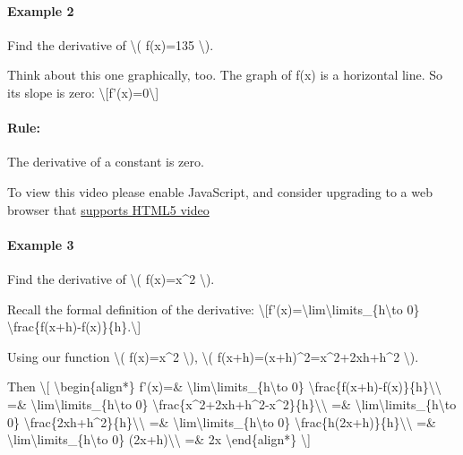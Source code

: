 \hypertarget{example-2}{%
\paragraph{Example 2}\label{example-2}}

Find the derivative of \textbackslash{}( f(x)=135 \textbackslash{}).

Think about this one graphically, too. The graph of f(x) is a horizontal
line. So its slope is zero:
\textbackslash{}{[}f'(x)=0\textbackslash{}{]}

\hypertarget{rule-1}{%
\paragraph{Rule:}\label{rule-1}}

The derivative of a constant is zero.

To view this video please enable JavaScript, and consider upgrading to a
web browser that \href{http://videojs.com/html5-video-support/}{supports
HTML5 video}

\hypertarget{example-3}{%
\paragraph{Example 3}\label{example-3}}

Find the derivative of \textbackslash{}( f(x)=x\^{}2 \textbackslash{}).

Recall the formal definition of the derivative:
\textbackslash{}{[}f'(x)=\textbackslash{}lim\textbackslash{}limits\_\{h\textbackslash{}to
0\} \textbackslash{}frac\{f(x+h)-f(x)\}\{h\}.\textbackslash{}{]}

Using our function \textbackslash{}( f(x)=x\^{}2 \textbackslash{}),
\textbackslash{}( f(x+h)=(x+h)\^{}2=x\^{}2+2xh+h\^{}2 \textbackslash{}).

Then \textbackslash{}{[} \textbackslash{}begin\{align*\} f'(x)=\&
\textbackslash{}lim\textbackslash{}limits\_\{h\textbackslash{}to 0\}
\textbackslash{}frac\{f(x+h)-f(x)\}\{h\}\textbackslash{}\textbackslash{}
=\& \textbackslash{}lim\textbackslash{}limits\_\{h\textbackslash{}to 0\}
\textbackslash{}frac\{x\^{}2+2xh+h\^{}2-x\^{}2\}\{h\}\textbackslash{}\textbackslash{}
=\& \textbackslash{}lim\textbackslash{}limits\_\{h\textbackslash{}to 0\}
\textbackslash{}frac\{2xh+h\^{}2\}\{h\}\textbackslash{}\textbackslash{}
=\& \textbackslash{}lim\textbackslash{}limits\_\{h\textbackslash{}to 0\}
\textbackslash{}frac\{h(2x+h)\}\{h\}\textbackslash{}\textbackslash{} =\&
\textbackslash{}lim\textbackslash{}limits\_\{h\textbackslash{}to 0\}
(2x+h)\textbackslash{}\textbackslash{} =\& 2x
\textbackslash{}end\{align*\} \textbackslash{}{]}

